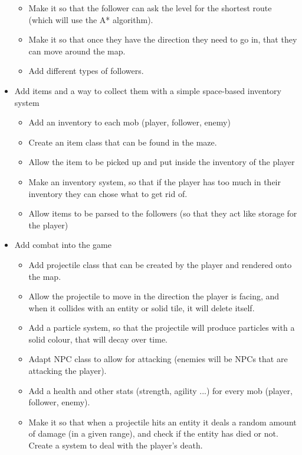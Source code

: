 \documentclass[../Main.tex]{subfiles}
\begin{document}
\begin{itemize}
\begin{itemize}
                    \item Make it so that the follower can ask the level for the shortest route (which will use the A* algorithm).
                    \item Make it so that once they have the direction they need to go in, that they can move around the map.
                    \item Add different types of followers.
                \end{itemize}
            \item Add items and a way to collect them with a simple space-based inventory system
                \begin{itemize}
                    \item Add an inventory to each mob (player, follower, enemy)
                    \item Create an item class that can be found in the maze.
                    \item Allow the item to be picked up and put inside the inventory of the player
                    \item Make an inventory system, so that if the player has too much in their inventory they can chose what to get rid of.
                    \item Allow items to be parsed to the followers (so that they act like storage for the player)
                \end{itemize}
            \item Add combat into the game
                \begin{itemize}
                    \item Add projectile class that can be created by the player and rendered onto the map.
                    \item Allow the projectile to move in the direction the player is facing, and when it collides with an entity or solid tile, it will delete itself.
                    \item Add a particle system, so that the projectile will produce particles with a solid colour, that will decay over time.
                    \item Adapt NPC class to allow for attacking (enemies will be NPCs that are attacking the player).
                    \item Add a health and other stats (strength, agility ...) for every mob (player, follower, enemy).
                    \item Make it so that when a projectile hits an entity it deals a random amount of damage (in a given range), and check if the entity has died or not. Create a system to deal with the player's death.

\end{itemize}
\end{itemize}
\end{document}
